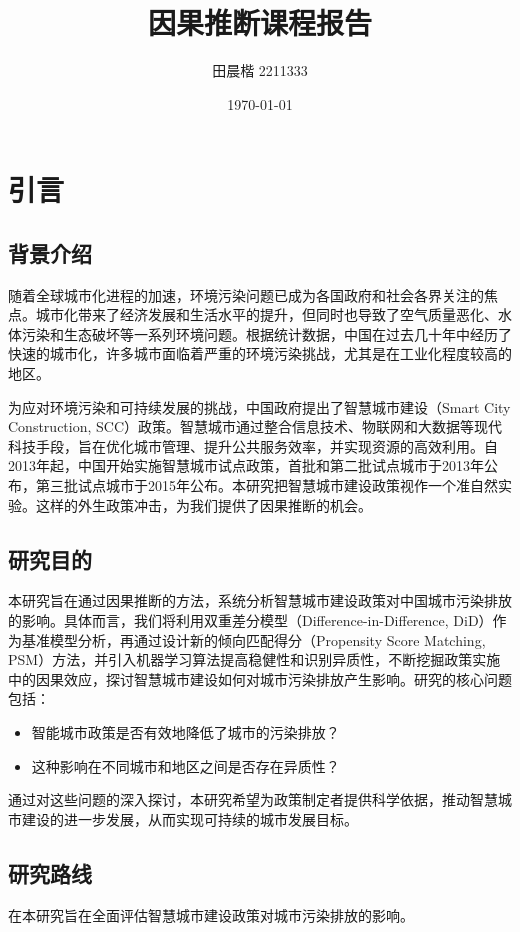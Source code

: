 \documentclass[a4paper,12pt]{article}
\title{因果推断课程报告}
\author{田晨楷 2211333}
\date{\today}
\begin{document}
\maketitle

\section{引言}
\subsection{背景介绍}
随着全球城市化进程的加速，环境污染问题已成为各国政府和社会各界关注的焦点。城市化带来了经济发展和生活水平的提升，但同时也导致了空气质量恶化、水体污染和生态破坏等一系列环境问题。根据统计数据，中国在过去几十年中经历了快速的城市化，许多城市面临着严重的环境污染挑战，尤其是在工业化程度较高的地区。

为应对环境污染和可持续发展的挑战，中国政府提出了智慧城市建设（Smart City Construction, SCC）政策。智慧城市通过整合信息技术、物联网和大数据等现代科技手段，旨在优化城市管理、提升公共服务效率，并实现资源的高效利用。自2013年起，中国开始实施智慧城市试点政策，首批和第二批试点城市于2013年公布，第三批试点城市于2015年公布。本研究把智慧城市建设政策视作一个准自然实验。这样的外生政策冲击，为我们提供了因果推断的机会。


\subsection{研究目的}
本研究旨在通过因果推断的方法，系统分析智慧城市建设政策对中国城市污染排放的影响。具体而言，我们将利用双重差分模型（Difference-in-Difference, DiD）作为基准模型分析，再通过设计新的倾向匹配得分（Propensity Score Matching, PSM）方法，并引入机器学习算法提高稳健性和识别异质性，不断挖掘政策实施中的因果效应，探讨智慧城市建设如何对城市污染排放产生影响。研究的核心问题包括：

\begin{itemize}
    \item 智能城市政策是否有效地降低了城市的污染排放？
    \item 这种影响在不同城市和地区之间是否存在异质性？
\end{itemize}

通过对这些问题的深入探讨，本研究希望为政策制定者提供科学依据，推动智慧城市建设的进一步发展，从而实现可持续的城市发展目标。

\subsection{研究路线}
在本研究旨在全面评估智慧城市建设政策对城市污染排放的影响。
\end{document}
